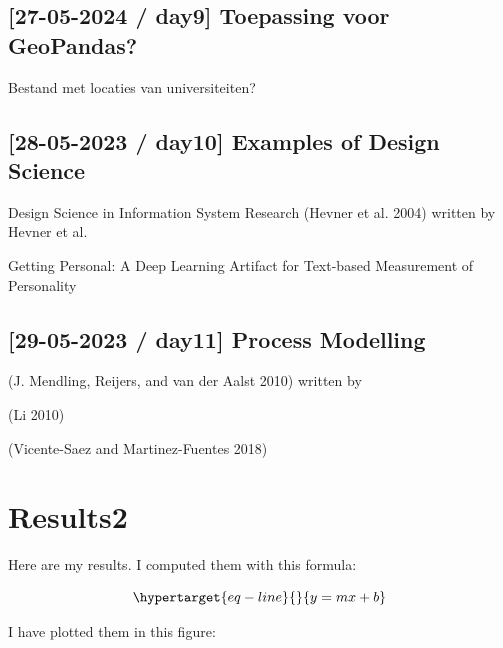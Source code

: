 \documentclass[
  letterpaper,
  DIV=11,
  numbers=noendperiod]{scrreprt}
\begin{document}
\hypertarget{day9-toepassing-voor-geopandas}{%
\section{{[}27-05-2024 / day9{]} Toepassing voor
GeoPandas?}\label{day9-toepassing-voor-geopandas}}

Bestand met locaties van universiteiten?

\hypertarget{day10-examples-of-design-science}{%
\section{{[}28-05-2023 / day10{]} Examples of Design
Science}\label{day10-examples-of-design-science}}

Design Science in Information System Research (Hevner et al. 2004)
written by Hevner et
al.~

Getting Personal: A Deep Learning Artifact for Text-based Measurement of
Personality

\hypertarget{day11-process-modelling}{%
\section{{[}29-05-2023 / day11{]} Process
Modelling}\label{day11-process-modelling}}

(J. Mendling, Reijers, and van der Aalst 2010) written by

(Li 2010)

(Vicente-Saez and Martinez-Fuentes 2018)

\hypertarget{sec-results}{%
\chapter{Results2}\label{sec-results}}

Here are my results. I computed them with this formula:

\begin{equation}\protect\hypertarget{eq-line}{}{ y = mx + b }\label{eq-line}\end{equation}

I have plotted them in this figure:
\end{document}
